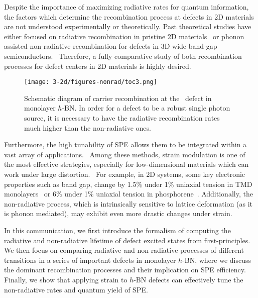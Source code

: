 Despite the importance of maximizing radiative rates for quantum information, the factors which determine the recombination process at defects in 2D materials are not understood experimentally or theoretically. Past theoretical studies have either focused on radiative recombination in pristine 2D materials~\cite{palummo2015exciton,wu2017first} or phonon assisted non-radiative recombination for defects in 3D wide band-gap semiconductors.~\cite{alkauskas2014first1,shi2015comparative} Therefore, a fully comparative study of both recombination processes for defect centers in 2D materials is highly desired.

\begin{figure}[t]
    \centering
  \texttt{[image: 3-2d/figures-nonrad/toc3.png]}
  \caption{Schematic diagram of carrier recombination at the \NBVN\ defect in monolayer $h$-BN. In order for a defect to be a robust single photon source, it is necessary to have the radiative recombination rates much higher than the non-radiative ones.}
  \label{fig:toc1}
\end{figure}

Furthermore, the high tunability of SPE allows them to be integrated within a vast array of applications.~\cite{tran2016quantum,aharonovich2016solid} Among these methods, strain modulation is one of the most effective strategies, especially for low-dimensional materials which can work under large distortion.~\cite{brawand2015surface}
For example, in 2D systems, some key electronic properties such as band gap, change by 1.5\% under 1\% uniaxial tension in TMD monolayers~\cite{chang2013orbital} or 6\% under 1\% uniaxial tension in phosphorene~\cite{peng2014strain}. Additionally, the non-radiative process, which is intrinsically sensitive to lattice deformation (as it is phonon mediated), may exhibit even more drastic changes under strain.

In this communication, we first introduce the formalism of computing the radiative and non-radiative lifetime of defect excited states from first-principles. We then focus on comparing radiative and non-radiative processes of different transitions in a series of important defects in monolayer $h$-BN, where we discuss the dominant recombination processes and their implication on SPE efficiency.
Finally, we show that applying strain to $h$-BN defects can effectively tune the non-radiative rates and quantum yield of SPE.

